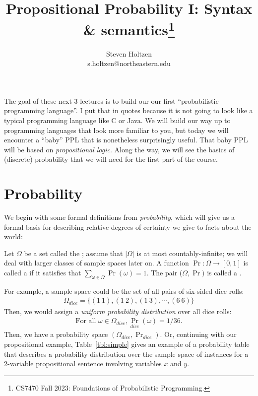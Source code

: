\documentclass{tufte-handout}
\title{Propositional Probability I: Syntax \& semantics\thanks{CS7470 Fall 2023: Foundations of Probabilistic Programming.}}
\author[]{Steven Holtzen\\s.holtzen@northeastern.edu}
\begin{document}
\maketitle%


The goal of these next 3 lectures is to build our our first ``probabilistic programming
language''. I put that in quotes because it is not going to look like a typical
programming language like C or Java. We will build our way up to programming
languages that look more familiar to you, but today we will encounter a ``baby''
PPL that is nonetheless surprisingly useful. That baby PPL will be based on
\emph{propositional logic}. Along the way, we will see the basics of
(discrete) probability that we will need for the first part of the course.

\section{Probability}
We begin with some formal definitions from \emph{probability}, which will give us a formal basis 
for describing relative degrees of certainty we give to facts about the world:
\begin{definition}
    Let $\Omega$ be a set called the ; assume that $|\Omega|$ is at most 
    countably-infinite; we will deal with larger classes of sample spaces later on.
    A function $\Pr : \Omega \rightarrow [0,1]$ is called a  
    if it satisfies that $\sum_{\omega \in \Omega} \Pr(\omega) = 1$.
    The pair ($\Omega, \Pr)$ is called a .
\end{definition}

For example, a sample space could be the set of all pairs of six-sided dice rolls:
\begin{align*}
    \Omega_{dice} = \{ (1~1), (1~2), (1~3), \cdots, (6~6)\}
\end{align*}
Then, we would assign a \emph{uniform probability distribution} over all dice
rolls:
\begin{align*}
    \text{For all } \omega \in \Omega_{dice}, \Pr_{dice}(\omega) = 1/36.
\end{align*}
Then, we have a probability space $(\Omega_{dice}, \Pr_{dice})$.
Or, continuing with our propositional example,
Table~\ref{tbl:simple} gives an example of a probability table that describes a
probability distribution over the sample space of instances for a 2-variable
propositional sentence involving variables $x$ and $y$.
\end{document}
